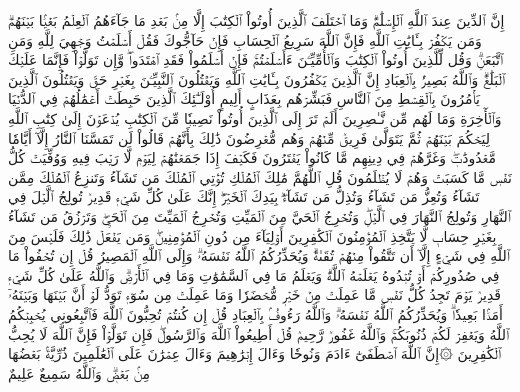 إِنَّ ٱلدِّينَ عِندَ ٱللَّهِ ٱلۡإِسۡلَٰمُۗ وَمَا ٱخۡتَلَفَ ٱلَّذِينَ أُوتُواْ ٱلۡكِتَٰبَ إِلَّا مِنۢ بَعۡدِ مَا جَآءَهُمُ ٱلۡعِلۡمُ بَغۡيَۢا بَيۡنَهُمۡۗ وَمَن يَكۡفُرۡ بِـَٔايَٰتِ ٱللَّهِ فَإِنَّ ٱللَّهَ سَرِيعُ ٱلۡحِسَابِ
فَإِنۡ حَآجُّوكَ فَقُلۡ أَسۡلَمۡتُ وَجۡهِيَ لِلَّهِ وَمَنِ ٱتَّبَعَنِۗ وَقُل لِّلَّذِينَ أُوتُواْ ٱلۡكِتَٰبَ وَٱلۡأُمِّيِّـۧنَ ءَأَسۡلَمۡتُمۡۚ فَإِنۡ أَسۡلَمُواْ فَقَدِ ٱهۡتَدَواْۖ وَّإِن تَوَلَّوۡاْ فَإِنَّمَا عَلَيۡكَ ٱلۡبَلَٰغُۗ وَٱللَّهُ بَصِيرُۢ بِٱلۡعِبَادِ
إِنَّ ٱلَّذِينَ يَكۡفُرُونَ بِـَٔايَٰتِ ٱللَّهِ وَيَقۡتُلُونَ ٱلنَّبِيِّـۧنَ بِغَيۡرِ حَقّٖ وَيَقۡتُلُونَ ٱلَّذِينَ يَأۡمُرُونَ بِٱلۡقِسۡطِ مِنَ ٱلنَّاسِ فَبَشِّرۡهُم بِعَذَابٍ أَلِيمٍ
أُوْلَـٰٓئِكَ ٱلَّذِينَ حَبِطَتۡ أَعۡمَٰلُهُمۡ فِي ٱلدُّنۡيَا وَٱلۡأٓخِرَةِ وَمَا لَهُم مِّن نَّـٰصِرِينَ
أَلَمۡ تَرَ إِلَى ٱلَّذِينَ أُوتُواْ نَصِيبٗا مِّنَ ٱلۡكِتَٰبِ يُدۡعَوۡنَ إِلَىٰ كِتَٰبِ ٱللَّهِ لِيَحۡكُمَ بَيۡنَهُمۡ ثُمَّ يَتَوَلَّىٰ فَرِيقٞ مِّنۡهُمۡ وَهُم مُّعۡرِضُونَ
ذَٰلِكَ بِأَنَّهُمۡ قَالُواْ لَن تَمَسَّنَا ٱلنَّارُ إِلَّآ أَيَّامٗا مَّعۡدُودَٰتٖۖ وَغَرَّهُمۡ فِي دِينِهِم مَّا كَانُواْ يَفۡتَرُونَ
فَكَيۡفَ إِذَا جَمَعۡنَٰهُمۡ لِيَوۡمٖ لَّا رَيۡبَ فِيهِ وَوُفِّيَتۡ كُلُّ نَفۡسٖ مَّا كَسَبَتۡ وَهُمۡ لَا يُظۡلَمُونَ
قُلِ ٱللَّهُمَّ مَٰلِكَ ٱلۡمُلۡكِ تُؤۡتِي ٱلۡمُلۡكَ مَن تَشَآءُ وَتَنزِعُ ٱلۡمُلۡكَ مِمَّن تَشَآءُ وَتُعِزُّ مَن تَشَآءُ وَتُذِلُّ مَن تَشَآءُۖ بِيَدِكَ ٱلۡخَيۡرُۖ إِنَّكَ عَلَىٰ كُلِّ شَيۡءٖ قَدِيرٞ
تُولِجُ ٱلَّيۡلَ فِي ٱلنَّهَارِ وَتُولِجُ ٱلنَّهَارَ فِي ٱلَّيۡلِۖ وَتُخۡرِجُ ٱلۡحَيَّ مِنَ ٱلۡمَيِّتِ وَتُخۡرِجُ ٱلۡمَيِّتَ مِنَ ٱلۡحَيِّۖ وَتَرۡزُقُ مَن تَشَآءُ بِغَيۡرِ حِسَابٖ
لَّا يَتَّخِذِ ٱلۡمُؤۡمِنُونَ ٱلۡكَٰفِرِينَ أَوۡلِيَآءَ مِن دُونِ ٱلۡمُؤۡمِنِينَۖ وَمَن يَفۡعَلۡ ذَٰلِكَ فَلَيۡسَ مِنَ ٱللَّهِ فِي شَيۡءٍ إِلَّآ أَن تَتَّقُواْ مِنۡهُمۡ تُقَىٰةٗۗ وَيُحَذِّرُكُمُ ٱللَّهُ نَفۡسَهُۥۗ وَإِلَى ٱللَّهِ ٱلۡمَصِيرُ
قُلۡ إِن تُخۡفُواْ مَا فِي صُدُورِكُمۡ أَوۡ تُبۡدُوهُ يَعۡلَمۡهُ ٱللَّهُۗ وَيَعۡلَمُ مَا فِي ٱلسَّمَٰوَٰتِ وَمَا فِي ٱلۡأَرۡضِۗ وَٱللَّهُ عَلَىٰ كُلِّ شَيۡءٖ قَدِيرٞ
يَوۡمَ تَجِدُ كُلُّ نَفۡسٖ مَّا عَمِلَتۡ مِنۡ خَيۡرٖ مُّحۡضَرٗا وَمَا عَمِلَتۡ مِن سُوٓءٖ تَوَدُّ لَوۡ أَنَّ بَيۡنَهَا وَبَيۡنَهُۥٓ أَمَدَۢا بَعِيدٗاۗ وَيُحَذِّرُكُمُ ٱللَّهُ نَفۡسَهُۥۗ وَٱللَّهُ رَءُوفُۢ بِٱلۡعِبَادِ
قُلۡ إِن كُنتُمۡ تُحِبُّونَ ٱللَّهَ فَٱتَّبِعُونِي يُحۡبِبۡكُمُ ٱللَّهُ وَيَغۡفِرۡ لَكُمۡ ذُنُوبَكُمۡۚ وَٱللَّهُ غَفُورٞ رَّحِيمٞ
قُلۡ أَطِيعُواْ ٱللَّهَ وَٱلرَّسُولَۖ فَإِن تَوَلَّوۡاْ فَإِنَّ ٱللَّهَ لَا يُحِبُّ ٱلۡكَٰفِرِينَ
۞إِنَّ ٱللَّهَ ٱصۡطَفَىٰٓ ءَادَمَ وَنُوحٗا وَءَالَ إِبۡرَٰهِيمَ وَءَالَ عِمۡرَٰنَ عَلَى ٱلۡعَٰلَمِينَ
ذُرِّيَّةَۢ بَعۡضُهَا مِنۢ بَعۡضٖۗ وَٱللَّهُ سَمِيعٌ عَلِيمٌ

